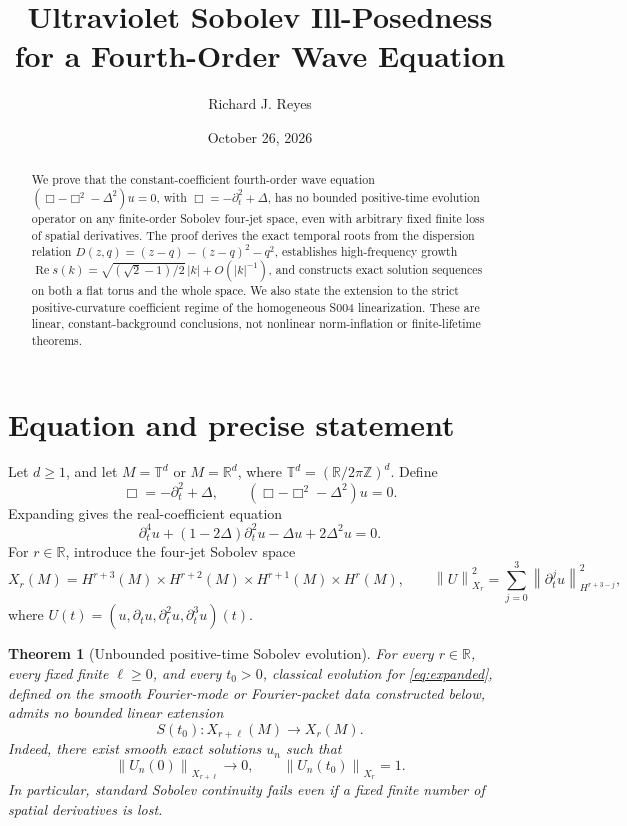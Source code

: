 \documentclass[11pt]{article}
\title{Ultraviolet Sobolev Ill-Posedness for a Fourth-Order Wave Equation}
\author{Richard J. Reyes}
\date{October 26, 2026}
\newtheorem{theorem}{Theorem}
\newcommand{\RR}{\mathbb{R}}
\newcommand{\TT}{\mathbb{T}}
\newcommand{\norm}[1]{\left\lVert #1\right\rVert}
\begin{document}
\maketitle

\begin{abstract}
We prove that the constant-coefficient fourth-order wave equation
\(
(\Box-\Box^2-\Delta^2)u=0
\), with \(\Box=-\partial_t^2+\Delta\), has no bounded positive-time evolution operator on any finite-order Sobolev four-jet space, even with arbitrary fixed finite loss of spatial derivatives. The proof derives the exact temporal roots from the dispersion relation \(D(z,q)=(z-q)-(z-q)^2-q^2\), establishes high-frequency growth \(\operatorname{Re}s(k)=\sqrt{(\sqrt2-1)/2}\,|k|+O(|k|^{-1})\), and constructs exact solution sequences on both a flat torus and the whole space. We also state the extension to the strict positive-curvature coefficient regime of the homogeneous S004 linearization. These are linear, constant-background conclusions, not nonlinear norm-inflation or finite-lifetime theorems.
\end{abstract}

\section{Equation and precise statement}

Let \(d\ge 1\), and let \(M=\TT^d\) or \(M=\RR^d\), where \(\TT^d=(\RR/2\pi\mathbb{Z})^d\). Define
\begin{equation}\label{eq:operator}
  \Box=-\partial_t^2+\Delta,
  \qquad (\Box-\Box^2-\Delta^2)u=0.
\end{equation}
Expanding gives the real-coefficient equation
\begin{equation}\label{eq:expanded}
  \partial_t^4u+(1-2\Delta)\partial_t^2u-\Delta u+2\Delta^2u=0.
\end{equation}
For \(r\in\RR\), introduce the four-jet Sobolev space
\begin{equation}\label{eq:space}
  X_r(M)=H^{r+3}(M)\times H^{r+2}(M)
   \times H^{r+1}(M)\times H^r(M),
  \qquad
  \norm{U}_{X_r}^2=\sum_{j=0}^3\norm{\partial_t^j u}_{H^{r+3-j}}^2,
\end{equation}
where \(U(t)=(u,\partial_tu,\partial_t^2u,\partial_t^3u)(t)\).

\begin{theorem}[Unbounded positive-time Sobolev evolution]\label{thm:main}
For every \(r\in\RR\), every fixed finite \(\ell\ge0\), and every \(t_0>0\), classical evolution for \eqref{eq:expanded}, defined on the smooth Fourier-mode or Fourier-packet data constructed below, admits no bounded linear extension
\[
   S(t_0):X_{r+\ell}(M)\longrightarrow X_r(M).
\]
Indeed, there exist smooth exact solutions \(u_n\) such that
\[
  \norm{U_n(0)}_{X_{r+\ell}}\longrightarrow 0,
  \qquad
  \norm{U_n(t_0)}_{X_r}=1.
\]
In particular, standard Sobolev continuity fails even if a fixed finite number of spatial derivatives is lost.
\end{theorem}
\end{document}
